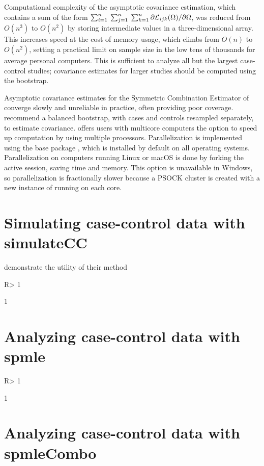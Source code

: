 \documentclass[nojss]{jss}
\begin{document}
Computational complexity of the asymptotic covariance estimation, which
contains a sum of the form
\(\sum_{i=1}^{n} \: \sum_{j=1}^{n} \: \sum_{k=1}^{n} \partial {\cal L}_{ijk}(\Omega) / \partial \Omega\),
was reduced from \(O(n^3)\) to \(O(n^2)\) by storing intermediate values
in a three-dimensional array. This increases speed at the cost of memory
usage, which climbs from \(O(n)\) to \(O(n^2)\), setting a practical
limit on sample size in the low tens of thousands for average personal
computers. This is sufficient to analyze all but the largest
case-control studies; covariance estimates for larger studies should be
computed using the bootstrap.

Asymptotic covariance estimates for the Symmetric Combination Estimator
of \citeauthor{Wang2018unpublished} converge slowly and unreliable in
practice, often providing poor coverage.
\citeauthor{Wang2018unpublished} recommend a balanced bootstrap, with
cases and controls resampled separately, to estimate covariance.
 offers users with multicore computers the option to
speed up computation by using multiple processors. Parallelization is
implemented using the  base package , which is
installed by default on all operating systems. Parallelization on
computers running Linux or macOS is done by forking the active
 session, saving time and memory. This option is unavailable
in Windows, so parallelization is fractionally slower because a PSOCK
cluster is created with a new instance of  running on each
core.

\section{Simulating case-control data with simulateCC} \label{sec:simulateCC}

\cite{Wang2018unpublished} demonstrate the utility of their method

\begin{CodeChunk}

\begin{CodeInput}
R> 1
\end{CodeInput}

\begin{CodeOutput}
[1] 1
\end{CodeOutput}
\end{CodeChunk}

\section{Analyzing case-control data with spmle} \label{sec:spmle}

\begin{CodeChunk}

\begin{CodeInput}
R> 1
\end{CodeInput}

\begin{CodeOutput}
[1] 1
\end{CodeOutput}
\end{CodeChunk}

\section{Analyzing case-control data with spmleCombo} \label{sec:spmleCombo}


\end{document}
